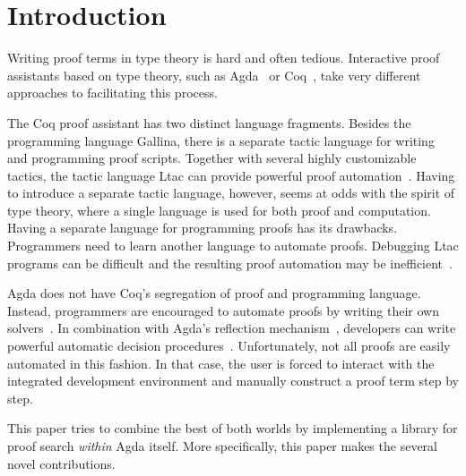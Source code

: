 \section{Introduction}
\label{sec:intro}

Writing proof terms in type theory is hard and often tedious.
Interactive proof assistants based on type theory, such as
Agda~\cite{agda} or Coq~\cite{coq}, take very different approaches to
facilitating this process.

The Coq proof assistant has two distinct language fragments. Besides
the programming language Gallina, there is a separate tactic language
for writing and programming proof scripts. Together with several
highly customizable tactics, the tactic language Ltac can provide
powerful proof automation~\cite{chlipala}. Having to introduce a
separate tactic language, however, seems at odds with the spirit of
type theory, where a single language is used for both proof and
computation.  Having a separate language for programming proofs has
its drawbacks. Programmers need to learn another language to automate
proofs. Debugging Ltac programs can be difficult and the resulting
proof automation may be inefficient~\cite{brabaint}.

Agda does not have Coq's segregation of proof and programming
language.  Instead, programmers are encouraged to automate proofs by
writing their own solvers~\cite{ulf-tphols}. In combination with
Agda's reflection mechanism~\cite{agda-relnotes-228,van-der-walt}, developers can write
powerful automatic decision procedures~\cite{allais}. Unfortunately,
not all proofs are easily automated in this fashion. In that case,
the user is forced to interact with the integrated development
environment and manually construct a proof term step by step.

This paper tries to combine the best of both worlds by implementing a
library for proof search \emph{within} Agda itself. More specifically,
this paper makes the several novel contributions.


